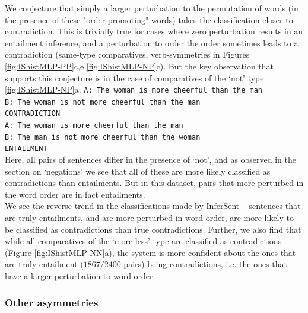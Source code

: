 \documentclass[10pt,letterpaper]{article}
\begin{document}
We conjecture that simply a larger perturbation to the permutation of words (in the presence of these "order promoting" words) takes the classification closer to contradiction. This is trivially true for cases where zero perturbation results in an entailment inference, and a perturbation to order the order sometimes leads to a contradiction (same-type comparatives, verb-symmetries in Figures \ref{fig:IShistMLP-PP}c,e \ref{fig:IShistMLP-NP}c). But the key observation that supports this conjecture is in the case of comparatives of the `not' type \ref{fig:IShistMLP-NP}a. 
{\tt A: The woman is more cheerful than the man \\ B: The woman is not more cheerful than the man\\ CONTRADICTION \\}{\tt A: The woman is more cheerful than the man \\ B: The man is not more cheerful than the woman \\ ENTAILMENT} \\
Here, all pairs of sentences differ in the presence of `not', and as observed in the section on `negations' we see that all of these are more likely classified as contradictions than entailments. But in this dataset, pairs that more perturbed in the word order are in fact entailments. \\
We see the reverse trend in the classifications made by InferSent – sentences that are truly entailments, and are more perturbed in word order, are more likely to be classified as contradictions than true contradictions. Further, we also find that while all comparatives of the `more-less' type are classified as contradictions (Figure \ref{fig:IShistMLP-NN}a), the system is more confident about the ones that are truly entailment ($1867/2400$ pairs) being contradictions, i.e. the ones that have a larger perturbation to word order. 

\subsubsection{Other asymmetries}
\end{document}

